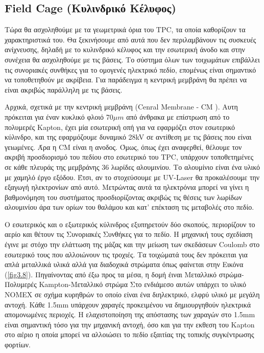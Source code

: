 \subsection{ Field Cage (Κυλινδρικό Κέλυφος)  }
	Tώρα θα ασχοληθούμε με τα γεωμετρικά όρια του TPC, τα οποία καθορίζουν τα χαρακτηριστικά του. Θα ξεκινήσουμε από αυτά που δεν περιλαμβάνουν τις συσκευές ανίχνευσης, δηλαδή με το κυλινδρικό κέλυφος και την εσωτερική άνοδο και στην συνέχεια θα ασχοληθούμε με τις βάσεις. Το σύστημα όλων των τοιχωμάτων επιβάλλει τις συνοριακές συνθήκες για το ομογενές ηλεκτρικό πεδίο, επομένως είναι σημαντικό να τοποθετηθούν με ακρίβεια. Για παράδειγμα η κεντρική μεμβράνη θα πρέπει να είναι ακριβώς παράλληλη με τις βάσεις.
	
	Αρχικά, σχετικά με την κεντρική μεμβράνη (Cenral Membrane - CM ). Αυτη πρόκειται για έναν κυκλικό φλοιό 70$\mu m$ από άνθρακα με επίστρωση από το πολυμερές Kapton, έχει μία εσωτερική οπή για να εφαρμόζει στον εσωτερικό κύλινδρο, και  της  εφαρμόζουμε δυναμικό 28kV σε αντίθεση με τις βάσεις που είναι γειωμένες. Άρα η CM είναι η ανοδος. Όμως, όπως έχει αναφερθεί, θέλουμε τον ακριβή προσδιορισμό του πεδίου στο εσωτερικό του TPC, υπάρχουν τοποθετημένες σε κάθε πλευράς της μεμβράνης 36 λωρίδες αλουμινίου. Το αλουμίνιο είναι ένα υλικό με χαμηλό έργο εξόδου. Έτσι, αν το στοχεύσουμε με UV-Laser θα προκαλέσουμε την εξαγωγή ηλεκτρονίων από αυτό. Μετρώντας αυτά τα ηλεκτρόνια μπορεί να γίνει η βαθμονόμηση του συστήματος προσδιορίζοντας ακριβώς τις θέσεις των λωρίδων αλουμινίου άρα των ορίων του θαλάμου και κατ' επέκταση τις μεταβολές στο πεδίο.
	
	Ο εσωτερικός και ο εξωτερικός κύλινδρος εξυπηρετούν δύο σκοπούς,  περιορίζουν το αερίο και θέτουν τις Συνοριακές Συνθήκες για το πεδίο. Η μηχανική τους σχεδίαση έγινε με στόχο την ελάττωση της μάζας και την μείωση των σκεδάσεων Coulomb στο εσωτερικό τους που αλλοιώνουν τις τροχιές. 
	Τα τοιχώματά τους δεν πρόκειται για απλά μεταλλικά υλικά αλλά για διαδοχικά στρώματα όπως φαίνεται στην Εικόνα (\ref{fig3.8}). 
	Πηγαίνοντας από έξω προς τα μέσα, η δομή έιναι Μεταλλικό στρώμα-Πολυμερές Kampton-Μεταλλικό στρώμα	
	Στο ενδιάμεσο αυτών υπάρχει το υλικό NOMEX σε σχήμα κυρηθρών το οποίο είναι ένα διηλεκτρικό, ελφρύ υλικό με μεγάλη αντοχή. 
	Κάθε 1.5mm υπάρχουν χαραγές προκειμένου να δημιουργηθούν ηλεκτρικά απομονωμένες περιοχές.
	 Η ελαχιστοποίηση της απόστασης των χαραγών στο 1.5mm είναι σημαντική τόσο για την μηχανική αντοχή, όσο και για την εκθεση του Kapton στο αέριο  η οποία μπορεί να αλλοιώσει το πεδίο εξαιτίας της τοπικής συγκέντρωσης φορτίων.
	
